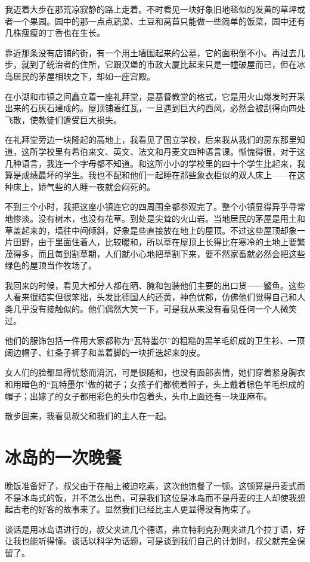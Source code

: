 \documentclass[10pt]{book}
\begin{document}
我迈着大步在那荒凉寂静的路上走着。不时看见一块好象旧地毯似的发黄的草坪或者一个果园。园中的那一点点蔬菜、土豆和莴苣只能做一些简单的饭菜，园中还有几株瘦瘦的丁香也在生长。

靠近那条没有店铺的街，有一个用土墙围起来的公墓，它的面积倒不小。再过去几步，就到了统治者的住所，它跟汉堡的市政大厦比起来只是一幢破屋而已，但在冰岛居民的茅屋相映之下，却如一座宫殿。

在小湖和市镇之间矗立着一座礼拜堂，是基督教堂的格式，它是用火山爆发时开采出来的石灰石建成的。屋顶铺着红瓦，一旦遇到巨大的西风，必然会被刮得向四处飞散，使教徒们遭受巨大损失。

在礼拜堂旁边一块隆起的高地上，我看见了国立学校，后来我从我们的房东那里知道，这所学校里有希伯来文、英文、法文和丹麦文四种语言课。惭愧得很，对于这几种语言，我连一个字母都不知道。和这所小小的学校里的四十个学生比起来，我算是成绩最坏的学生。我也不配和他们一起睡在那些象衣柜似的双人床上——在这种床上，娇气些的人睡一夜就会闷死的。

不到三个小时，我把这座小镇连它的四周围全都参观完了。整个小镇显得异乎寻常地惨淡。没有树木，也没有花草。到处是尖耸的火山岩。当地居民的茅屋是用土和草盖起来的，墙往中间倾斜，好象是些直接放在地上的屋顶。不过这些屋顶却象一片田野，由于里面住着人，比较暖和，所以草在屋顶上长得比在寒冷的土地上要繁茂得多，而且每到割草期，人们就小心地把草割下来，要不然家畜就必然会把这些绿色的屋顶当作牧场了。

我回来的时候，看见大部分人都在晒、腌和包装他们主要的出口货——鳘鱼。这些人看来很结实但很笨拙，头发比德国人的还黄，神色忧郁，仿佛他们觉得自己和人类几乎没有接触似的。他们偶然大笑一下，可是我从来没有看见任何一个人微笑过。

他们的服饰包括一件用大家都称为“瓦特墨尔”的粗糙的黑羊毛织成的卫生衫、一顶阔边帽子、红条子裤子和盖着脚的一块折迭起来的皮。

女人们的脸都显得忧愁而消沉，可是很随和，也没有面部表情，她们穿着紧身胸衣和用暗色的“瓦特墨尔”做的裙子；女孩子们都梳着辫子，头上戴着棕色羊毛织成的帽子；出嫁了的女子都用彩色的头巾包着头，头巾上面还有一块亚麻布。

散步回来，我看见叔父和我们的主人在一起。
\chapter{冰岛的一次晚餐}
晚饭准备好了，叔父由于在船上被迫吃素，这次他饱餐了一顿。这顿算是丹麦式而不是冰岛式的饭，并不怎么出色，可是我们这位是冰岛而不是丹麦的主人却使我想起古老的好客的故事来了。显然我们已经比主人更显得没有拘束了。

谈话是用冰岛语进行的，叔父夹进几个德语，弗立特利克孙则夹进几个拉丁语，好让我也能听得懂。谈话以科学为话题，可是谈到我们自己的计划时，叔父就完全保留了。
\end{document}
